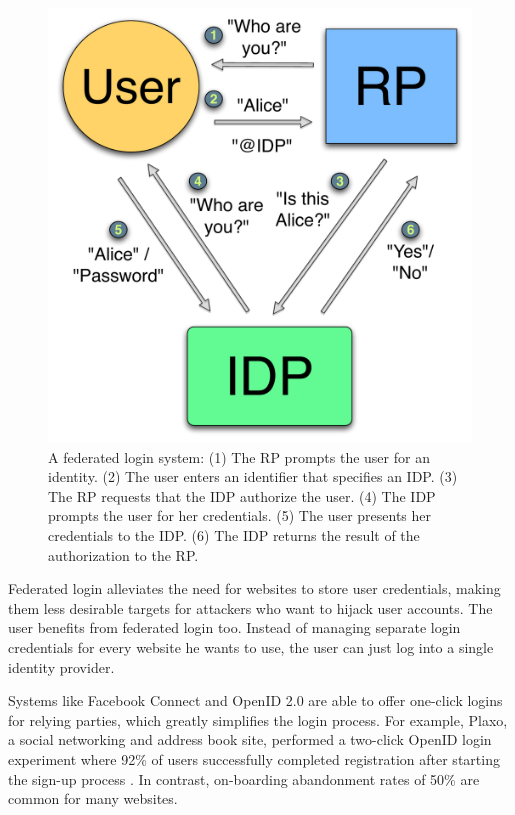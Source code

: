 \documentclass[11pt]{llncs}
\begin{document}
\begin{figure}
  \centering
  \includegraphics[scale=0.5]{figs/fig-fedlog-color.pdf}
  \caption{A federated login system: (1) The RP prompts the user
    for an identity. (2) The user enters an identifier that specifies
    an IDP. (3) The RP requests that the IDP authorize the user. (4)
    The IDP prompts the user for her credentials. (5) The user
    presents her credentials to the IDP. (6) The IDP returns the
    result of the authorization to the RP.}
  \label{fig:fedlog}
\end{figure}

Federated login alleviates the need for websites to store user
credentials, making them less desirable targets for attackers who want
to hijack user accounts. The user benefits from federated login too.
Instead of managing separate login credentials for every website he
wants to use, the user can just log into a single identity provider.

Systems like Facebook Connect and OpenID 2.0 are able to offer
one-click logins for relying parties, which greatly simplifies the
login process. For example, Plaxo, a social networking and address
book site, performed a two-click OpenID login experiment where 92\% of
users successfully completed registration after starting the sign-up
process \cite{Ki09}. In contrast, on-boarding abandonment rates of
50\% are common for many websites.
\end{document}
